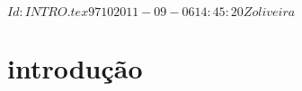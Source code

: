 \SVN $Id: INTRO.tex 9710 2011-09-06 14:45:20Z oliveira $
\chapter[Introdução, por Autor]{introdução}



